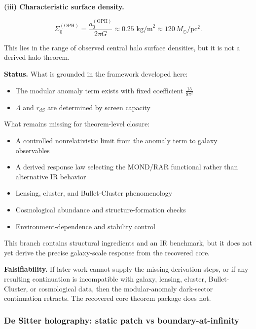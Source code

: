 \textbf{(iii) Characteristic surface density.}

\[
\Sigma_0^{\mathrm{(OPH)}} = \frac{a_0^{\mathrm{(OPH)}}}{2\pi G}
\approx 0.25 \text{ kg/m}^2 \approx 120 \, M_\odot/\text{pc}^2.
\]

This lies in the range of observed central halo surface densities, but it is not a derived halo theorem.

\textbf{Status.} What is grounded in the framework developed here:

\begin{itemize}
\tightlist
\item
  The modular anomaly term exists with fixed coefficient \(\frac{15}{8\pi^2}\)
\item
  \(\Lambda\) and \(r_{dS}\) are determined by screen capacity
\end{itemize}

What remains missing for theorem-level closure:

\begin{itemize}
\tightlist
\item
  A controlled nonrelativistic limit from the anomaly term to galaxy observables
\item
  A derived response law selecting the MOND/RAR functional rather than alternative IR behavior
\item
  Lensing, cluster, and Bullet-Cluster phenomenology
\item
  Cosmological abundance and structure-formation checks
\item
  Environment-dependence and stability control
\end{itemize}

This branch contains structural ingredients and an IR benchmark, but it does not yet derive the precise galaxy-scale response from the recovered core.

\textbf{Falsifiability.} If later work cannot supply the missing derivation steps, or if any resulting continuation is incompatible with galaxy, lensing, cluster, Bullet-Cluster, or cosmological data, then the modular-anomaly dark-sector continuation retracts. The recovered core theorem package does not.

\subsubsection{De Sitter holography: static patch vs boundary-at-infinity}\label{516-de-sitter-holography-static-patch-vs-boundary-at-infinity}

